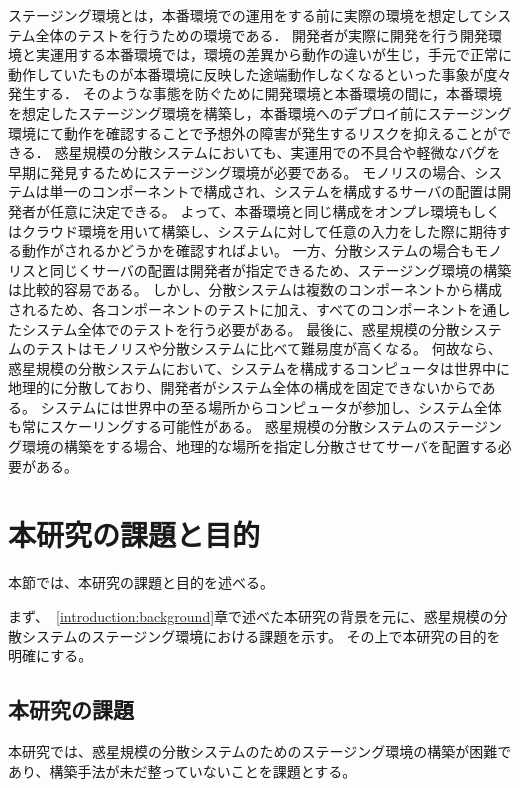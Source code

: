 ステージング環境とは，本番環境での運用をする前に実際の環境を想定してシステム全体のテストを行うための環境である．
開発者が実際に開発を行う開発環境と実運用する本番環境では，環境の差異から動作の違いが生じ，手元で正常に動作していたものが本番環境に反映した途端動作しなくなるといった事象が度々発生する．
そのような事態を防ぐために開発環境と本番環境の間に，本番環境を想定したステージング環境を構築し，本番環境へのデプロイ前にステージング環境にて動作を確認することで予想外の障害が発生するリスクを抑えることができる．
惑星規模の分散システムにおいても、実運用での不具合や軽微なバグを早期に発見するためにステージング環境が必要である。
モノリスの場合、システムは単一のコンポーネントで構成され、システムを構成するサーバの配置は開発者が任意に決定できる。
よって、本番環境と同じ構成をオンプレ環境もしくはクラウド環境を用いて構築し、システムに対して任意の入力をした際に期待する動作がされるかどうかを確認すればよい。
一方、分散システムの場合もモノリスと同じくサーバの配置は開発者が指定できるため、ステージング環境の構築は比較的容易である。
しかし、分散システムは複数のコンポーネントから構成されるため、各コンポーネントのテストに加え、すべてのコンポーネントを通したシステム全体でのテストを行う必要がある。
最後に、惑星規模の分散システムのテストはモノリスや分散システムに比べて難易度が高くなる。
何故なら、惑星規模の分散システムにおいて、システムを構成するコンピュータは世界中に地理的に分散しており、開発者がシステム全体の構成を固定できないからである。
システムには世界中の至る場所からコンピュータが参加し、システム全体も常にスケーリングする可能性がある。
惑星規模の分散システムのステージング環境の構築をする場合、地理的な場所を指定し分散させてサーバを配置する必要がある。

\section{本研究の課題と目的}

本節では、本研究の課題と目的を述べる。

まず、~\ref{introduction:background}章で述べた本研究の背景を元に、惑星規模の分散システムのステージング環境における課題を示す。
その上で本研究の目的を明確にする。

\subsection{本研究の課題}
\label{introduction:issue-and-aim:issue}

本研究では、惑星規模の分散システムのためのステージング環境の構築が困難であり、構築手法が未だ整っていないことを課題とする。

